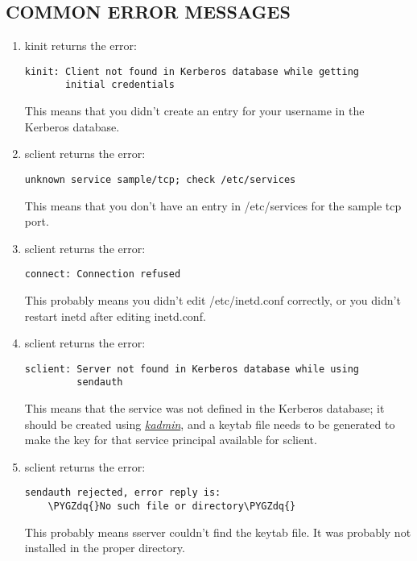 \documentclass[letterpaper,10pt,english]{sphinxmanual}
\def\PYGZdq{\char`\"}
\begin{document}
\subsection{COMMON ERROR MESSAGES}
\label{admin/admin_commands/sserver:common-error-messages}\begin{enumerate}
\item {} 
kinit returns the error:

\begin{Verbatim}[commandchars=\\\{\}]
kinit: Client not found in Kerberos database while getting
       initial credentials
\end{Verbatim}

This means that you didn't create an entry for your username in the
Kerberos database.

\item {} 
sclient returns the error:

\begin{Verbatim}[commandchars=\\\{\}]
unknown service sample/tcp; check /etc/services
\end{Verbatim}

This means that you don't have an entry in /etc/services for the
sample tcp port.

\item {} 
sclient returns the error:

\begin{Verbatim}[commandchars=\\\{\}]
connect: Connection refused
\end{Verbatim}

This probably means you didn't edit /etc/inetd.conf correctly, or
you didn't restart inetd after editing inetd.conf.

\item {} 
sclient returns the error:

\begin{Verbatim}[commandchars=\\\{\}]
sclient: Server not found in Kerberos database while using
         sendauth
\end{Verbatim}

This means that the  service was not
defined in the Kerberos database; it should be created using
{\hyperref[admin/admin_commands/kadmin_local:kadmin-1]{\emph{kadmin}}}, and a keytab file needs to be generated to make
the key for that service principal available for sclient.

\item {} 
sclient returns the error:

\begin{Verbatim}[commandchars=\\\{\}]
sendauth rejected, error reply is:
    \PYGZdq{}No such file or directory\PYGZdq{}
\end{Verbatim}

This probably means sserver couldn't find the keytab file.  It was
probably not installed in the proper directory.

\end{enumerate}
\end{document}
